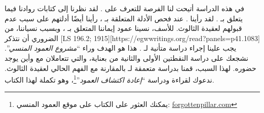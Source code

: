 في هذه الدراسة أتيحت لنا الفرصة للتعرف على . لقد نظرنا إلى كتابات روادنا فيما يتعلق بـ . لقد رأينا . عند فحص الأدلة المتعلقة بـ ، رأينا أيضًا أدلتهم على سبب عدم قبولهم لعقيدة الثالوث. للأسف، نسينا عمود إيماننا المتعلق بـ ، وبسبب نسياننا، من الضروري أن نتذكر [LS 196.2; 1915][https://egwwritings.org/read?panels=p41.1083] يجب علينا إجراء دراسة متأنية لـ . هذا هو الهدف وراء “\textit{مشروع العمود المنسي}”. نشجعك على دراسة النقطتين الأولى والثانية من  بعناية، والتي تتعاملان مع  وأين يوجد حضوره. لهذا السبب، قمنا بدراسة متعمقة لـ  بالمقارنة مع الفهم الحالي لعقيدة الثالوث. ندعوك لقراءة ودراسة “\textit{إعادة اكتشاف العمود}”\footnote{يمكنك العثور على الكتاب على موقع العمود المنسي: \href{http://forgottenpillar.com}{forgottenpillar.com}}، وهو تكملة لهذا الكتاب.


